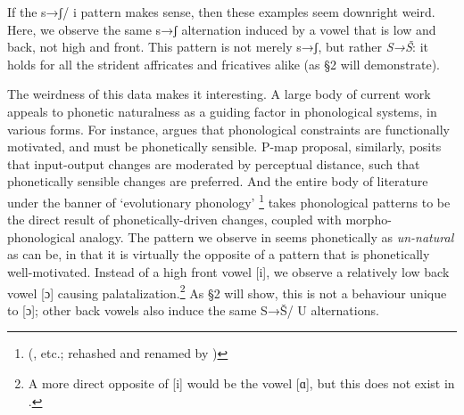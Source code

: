 If the s→ʃ/ {\longrule} i pattern makes sense, then these examples seem downright weird. Here, we observe the same s→ʃ alternation induced by a vowel that is low and back, not high and front. This pattern is not merely s→ʃ, but rather \textit{S→Š}: it holds for all the strident affricates and fricatives alike (as §2 will demonstrate).

The weirdness of this data makes it interesting. A large body of current work appeals to phonetic naturalness as a guiding factor in phonological systems, in various forms. For instance, \citet{Hayes1999} argues that phonological constraints are functionally motivated, and must be phonetically sensible.  P-map proposal, similarly, posits that input-output changes are moderated by perceptual distance, such that phonetically sensible changes are preferred. And the entire body of literature under the banner of ‘evolutionary phonology’
\footnote{(\citealt{Ohala1981,Ohala1990,Ohala:2004aa}, etc.; rehashed and renamed by \citealt{Blevins2004})} takes phonological patterns to be the direct result of phonetically-driven changes, coupled with morpho-phonological analogy. The pattern we observe in  seems phonetically as \textit{un-natural} as can be, in that it is virtually the opposite of a pattern that is phonetically well-motivated. Instead of a high front vowel [i], we observe a relatively low back vowel [ɔ] causing palatalization.\footnote{A more direct opposite of [i] would be the vowel [ɑ], but this does not exist in .} As §2 will show, this is not a behaviour unique to [ɔ]; other back vowels also induce the same S→Š/ {\longrule} U alternations.

